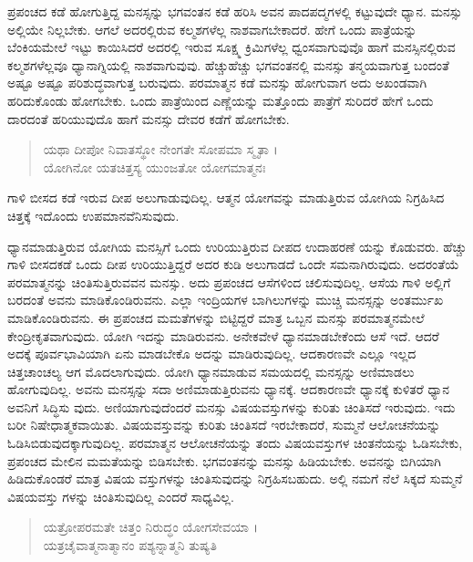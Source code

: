 ಪ್ರಪಂಚದ ಕಡೆ ಹೋಗುತ್ತಿದ್ದ ಮನಸ್ಸನ್ನು ಭಗವಂತನ ಕಡೆ ಹರಿಸಿ ಅವನ ಪಾದಪದ್ಮಗಳಲ್ಲಿ ಕಟ್ಟುವುದೇ ಧ್ಯಾನ. ಮನಸ್ಸು ಅಲ್ಲಿಯೇ ನಿಲ್ಲಬೇಕು. ಆಗಲೆ ಅದರಲ್ಲಿರುವ ಕಲ್ಮಶಗಳೆಲ್ಲ ನಾಶವಾಗಬೇಕಾದರೆ. ಹೇಗೆ ಒಂದು ಪಾತ್ರೆಯನ್ನು ಬೆಂಕಿಯಮೇಲೆ ಇಟ್ಟು ಕಾಯಿಸಿದರೆ ಅದರಲ್ಲಿ ಇರುವ ಸೂಕ್ಷ್ಮ ಕ್ರಿಮಿಗಳೆಲ್ಲ ಧ್ವಂಸವಾಗುವುವೊ ಹಾಗೆ ಮನಸ್ಸಿನಲ್ಲಿರುವ ಕಲ್ಮಶಗಳೆಲ್ಲವೂ ಧ್ಯಾನಾಗ್ನಿಯಲ್ಲಿ ನಾಶವಾಗುವುವು. ಹೆಚ್ಚುಹೆಚ್ಚು ಭಗವಂತನಲ್ಲಿ ಮನಸ್ಸು ತನ್ಮಯವಾಗುತ್ತ ಬಂದಂತೆ ಅಷ್ಟೂ ಅಷ್ಟೂ ಪರಿಶುದ್ಧವಾಗುತ್ತ ಬರುವುದು. ಪರಮಾತ್ಮನ ಕಡೆ ಮನಸ್ಸು ಹೋಗುವಾಗ ಅದು ಅಖಂಡವಾಗಿ ಹರಿದುಕೊಂಡು ಹೋಗಬೇಕು. ಒಂದು ಪಾತ್ರೆಯಿಂದ ಎಣ್ಣೆಯನ್ನು ಮತ್ತೊಂದು ಪಾತ್ರೆಗೆ ಸುರಿದರೆ ಹೇಗೆ ಒಂದು ದಾರದಂತೆ ಹರಿಯುವುದೊ ಹಾಗೆ ಮನಸ್ಸು ದೇವರ ಕಡೆಗೆ ಹೋಗಬೇಕು.

\begin{verse}
ಯಥಾ ದೀಪೋ ನಿವಾತಸ್ಥೋ ನೇಂಗತೇ ಸೋಪಮಾ ಸ್ಮೃತಾ ।\\ಯೋಗಿನೋ ಯತಚಿತ್ತಸ್ಯ ಯುಂಜತೋ ಯೋಗಮಾತ್ಮನಃ 
\end{verse}

{\small ಗಾಳಿ ಬೀಸದ ಕಡೆ ಇರುವ ದೀಪ ಅಲುಗಾಡುವುದಿಲ್ಲ. ಆತ್ಮನ ಯೋಗವನ್ನು ಮಾಡುತ್ತಿರುವ ಯೋಗಿಯ ನಿಗ್ರಹಿಸಿದ ಚಿತ್ತಕ್ಕೆ ಇದೊಂದು ಉಪಮಾನವೆನಿಸುವುದು.}

ಧ್ಯಾನಮಾಡುತ್ತಿರುವ ಯೋಗಿಯ ಮನಸ್ಸಿಗೆ ಒಂದು ಉರಿಯುತ್ತಿರುವ ದೀಪದ ಉದಾಹರಣೆ ಯನ್ನು ಕೊಡುವರು. ಹೆಚ್ಚು ಗಾಳಿ ಬೀಸದಕಡೆ ಒಂದು ದೀಪ ಉರಿಯುತ್ತಿದ್ದರೆ ಅದರ ಕುಡಿ ಅಲುಗಾಡದೆ ಒಂದೇ ಸಮನಾಗಿರುವುದು. ಅದರಂತೆಯೆ ಪರಮಾತ್ಮನನ್ನು ಚಿಂತಿಸುತ್ತಿರುವವನ ಮನಸ್ಸು. ಅದು ಪ್ರಪಂಚದ ಆಸೆಗಳಿಂದ ಚಲಿಸುವುದಿಲ್ಲ. ಆಸೆಯ ಗಾಳಿ ಅಲ್ಲಿಗೆ ಬರದಂತೆ ಅವನು ಮಾಡಿಕೊಂಡಿರುವನು. ಎಲ್ಲಾ ಇಂದ್ರಿಯಗಳ ಬಾಗಿಲುಗಳನ್ನು ಮುಚ್ಚಿ ಮನಸ್ಸನ್ನು ಅಂತರ್ಮುಖ ಮಾಡಿಕೊಂಡಿರುವನು. ಈ ಪ್ರಪಂಚದ ಮಮತೆಗಳನ್ನು ಬಿಟ್ಟಿದ್ದರೆ ಮಾತ್ರ ಒಬ್ಬನ ಮನಸ್ಸು ಪರಮಾತ್ಮನಮೇಲೆ ಕೇಂದ್ರೀಕೃತವಾಗುವುದು. ಯೋಗಿ ಇದನ್ನು ಮಾಡಿರುವನು. ಅನೇಕವೇಳೆ ಧ್ಯಾನಮಾಡಬೇಕೆಂದು ಆಸೆ ಇದೆ. ಆದರೆ ಅದಕ್ಕೆ ಪೂರ್ವಭಾವಿಯಾಗಿ ಏನು ಮಾಡಬೇಕೊ ಅದನ್ನು ಮಾಡಿರುವುದಿಲ್ಲ. ಆದಕಾರಣವೇ ಎಲ್ಲೂ ಇಲ್ಲದ ಚಿತ್ತಚಾಂಚಲ್ಯ ಆಗ ಮೊದಲಾಗುವುದು. ಯೋಗಿ ಧ್ಯಾನಮಾಡುವ ಸಮಯದಲ್ಲಿ ಮನಸ್ಸನ್ನು ಅಣಿಮಾಡಲು ಹೋಗುವುದಿಲ್ಲ. ಅವನು ಮನಸ್ಸನ್ನು ಸದಾ ಅಣಿಮಾಡುತ್ತಿರುವನು ಧ್ಯಾನಕ್ಕೆ. ಆದಕಾರಣವೇ ಧ್ಯಾನಕ್ಕೆ ಕುಳಿತರೆ ಧ್ಯಾನ ಅವನಿಗೆ ಸಿದ್ಧಿಸು ವುದು. ಅಣಿಯಾಗುವುದೆಂದರೆ ಮನಸ್ಸು ವಿಷಯವಸ್ತುಗಳನ್ನು ಕುರಿತು ಚಿಂತಿಸದೆ ಇರುವುದು. ಇದು ಬರೀ ನಿಷೇಧಾತ್ಮಕವಾಯಿತು. ವಿಷಯವಸ್ತುವನ್ನು ಕುರಿತು ಚಿಂತಿಸದೆ ಇರಬೇಕಾದರೆ, ಸುಮ್ಮನೆ ಆಲೋಚನೆಯನ್ನು ಓಡಿಸಿಬಿಡುವುದಕ್ಕಾಗುವುದಿಲ್ಲ. ಪರಮಾತ್ಮನ ಆಲೋಚನೆಯನ್ನು ತಂದು ವಿಷಯವಸ್ತುಗಳ ಚಿಂತನೆಯನ್ನು ಓಡಿಸಬೇಕು, ಪ್ರಪಂಚದ ಮೇಲಿನ ಮಮತೆಯನ್ನು ಬಿಡಿಸಬೇಕು. ಭಗವಂತನನ್ನು ಮನಸ್ಸು ಹಿಡಿಯಬೇಕು. ಅವನನ್ನು ಬಿಗಿಯಾಗಿ ಹಿಡಿದುಕೊಂಡರೆ ಮಾತ್ರ ವಿಷಯ ವಸ್ತುಗಳನ್ನು ಚಿಂತಿಸುವುದನ್ನು ನಿಗ್ರಹಿಸಬಹುದು. ಅಲ್ಲಿ ನಮಗೆ ನೆಲೆ ಸಿಕ್ಕದೆ ಸುಮ್ಮನೆ ವಿಷಯವಸ್ತು ಗಳನ್ನು ಚಿಂತಿಸುವುದಿಲ್ಲ ಎಂದರೆ ಸಾಧ್ಯವಿಲ್ಲ.

\begin{verse}
ಯತ್ರೋಪರಮತೇ ಚಿತ್ತಂ ನಿರುದ್ಧಂ ಯೋಗಸೇವಯಾ ।\\ಯತ್ರಚೈವಾತ್ಮನಾತ್ಮಾನಂ ಪಶ್ಯನ್ನಾತ್ಮನಿ ತುಷ್ಯತಿ 
\end{verse}

